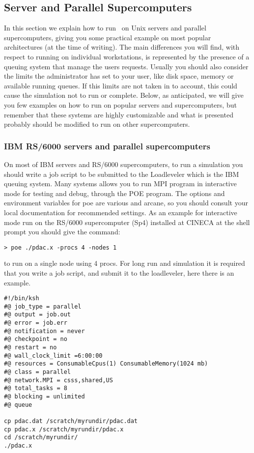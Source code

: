 \subsection{Server and Parallel Supercomputers}

In this section we explain how to run \PDAC\ on Unix servers
and parallel supercomputers, giving you some practical example
on most popular architectures (at the time of writing).
The main differences you will find, with respect to running on 
individual workstations,
is represented by the presence of a queuing system that
manage the users requests. Usually you should also 
consider the limits the administrator has set to your user,
like disk space, memory or available running queues. 
If this limits are not taken in to account, this could cause
the simulation not to run or complete.
Below, as anticipated, we will give you few examples on how to run
on popular servers and supercomputers, but remember that 
these systems are highly customizable and what is presented 
probably should be modified to run on other supercomputers.

\subsubsection{IBM RS/6000 servers and parallel supercomputers}

On most of IBM servers and RS/6000 supercomputers, to run a simulation you
should write a job script to be submitted to the Loadleveler which
is the IBM queuing system.
Many systems allows you to run MPI program in interactive mode for
testing and debug, through the POE program.  
The options and environment variables for poe are various and arcane, 
so you should consult your local documentation for recommended settings.  
As an example for interactive mode run on the RS/6000 supercomputer
(Sp4) installed at CINECA at the shell prompt you should give the
command:

\begin{verbatim}
> poe ./pdac.x -procs 4 -nodes 1 
\end{verbatim}

to run on a single node using 4 procs.
For long run and simulation it is required that you write a job script,
and submit it to the loadleveler, here there is an example.

\begin{verbatim}
#!/bin/ksh
#@ job_type = parallel
#@ output = job.out
#@ error = job.err
#@ notification = never
#@ checkpoint = no
#@ restart = no
#@ wall_clock_limit =6:00:00
#@ resources = ConsumableCpus(1) ConsumableMemory(1024 mb)
#@ class = parallel
#@ network.MPI = csss,shared,US
#@ total_tasks = 8
#@ blocking = unlimited
#@ queue

cp pdac.dat /scratch/myrundir/pdac.dat
cp pdac.x /scratch/myrundir/pdac.x
cd /scratch/myrundir/
./pdac.x
\end{verbatim}

